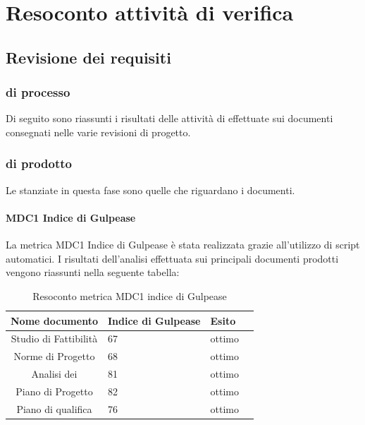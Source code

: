 \section{Resoconto attività di verifica}

\subsection{Revisione dei requisiti}

\subsubsection{ di processo}

Di seguito sono riassunti i risultati delle attività di  effettuate sui documenti consegnati nelle varie revisioni di progetto.

\subsubsection{ di prodotto}

Le  stanziate in questa fase sono quelle che riguardano i documenti.

\paragraph{MDC1 Indice di Gulpease}

La metrica MDC1 Indice di Gulpease è stata realizzata grazie all'utilizzo di script automatici. I risultati dell'analisi effettuata sui principali documenti prodotti vengono riassunti nella seguente tabella:

\begin{table}[H]
		\begin{center}
			\setlength{\aboverulesep}{0pt}
			\setlength{\belowrulesep}{0pt}
			\setlength{\extrarowheight}{.75ex}
			\begin{tabular}{ c C{4cm} C{2cm} C{3cm} }
				\textbf{Nome documento} & \textbf{Indice di Gulpease} & \textbf{Esito} \\
				\toprule
		Studio di Fattibilità & 67 & ottimo\\
		Norme di Progetto & 68 & ottimo\\
		Analisi dei  & 81 & ottimo\\
		Piano di Progetto & 82 & ottimo\\
		Piano di qualifica & 76 & ottimo\\
			
		\bottomrule
			\end{tabular}
			\caption{Resoconto metrica MDC1 indice di Gulpease}
		\end{center}
	\end{table}

